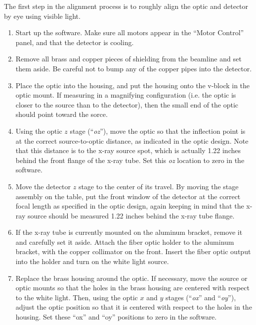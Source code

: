 The first step in the alignment process is to roughly align the optic and
detector by eye using visible light.

\begin{enumerate}

\item Start up the software. Make sure all motors appear in the ``Motor
  Control'' panel, and that the detector is cooling.

\item Remove all brass and copper pieces of shielding from the beamline and set
  them aside. Be careful not to bump any of the copper pipes into the detector.

\item Place the optic into the housing, and put the housing onto the v-block in
  the optic mount. If measuring in a magnifying configuration (i.e. the optic is
  closer to the source than to the detector), then the small end of the optic
  should point toward the sorce.

\item Using the optic $z$ stage (``\textit{oz}''), move the optic so that the
  inflection point is at the correct source-to-optic distance, as indicated in
  the optic design. Note that this distance is to the x-ray source spot, which
  is actually 1.22 inches behind the front flange of the x-ray
  tube\cite{tube_data_sheet}. Set this \textit{oz} location to zero in the
  software.

\item Move the detector $z$ stage to the center of its travel. By moving the
  stage assembly on the table, put the front window of the detector at the
  correct focal length as specified in the optic design, again keeping in mind
  that the x-ray source should be measured 1.22 inches behind the x-ray tube
  flange.

\item If the x-ray tube is currently mounted on the aluminum bracket, remove it
  and carefully set it aside. Attach the fiber optic holder to the aluminum
  bracket, with the copper collimator on the front. Insert the fiber optic
  output into the holder and turn on the white light source.

\item Replace the brass housing around the optic. If necessary, move the source
  or optic mounts so that the holes in the brass housing are centered with
  respect to the white light. Then, using the optic $x$ and $y$ stages
  (``\textit{ox}'' and ``\textit{oy}''), adjust the optic position so that it is
  centered with respect to the holes in the housing. Set these ``ox'' and ``oy''
  positions to zero in the software.


\end{enumerate}
